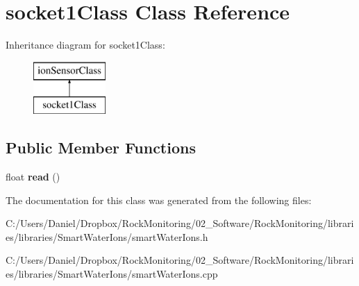 \hypertarget{classsocket1_class}{}\section{socket1\+Class Class Reference}
\label{classsocket1_class}
Inheritance diagram for socket1\+Class\+:\begin{figure}[H]
\begin{center}
\leavevmode
\includegraphics[height=2.000000cm]{classsocket1_class}
\end{center}
\end{figure}
\subsection*{Public Member Functions}
\begin{DoxyCompactItemize}
\item 
float {\bfseries read} ()\hypertarget{classsocket1_class_a0ad7dcd411aabee7afb280fa8b774f87}{}\label{classsocket1_class_a0ad7dcd411aabee7afb280fa8b774f87}

\end{DoxyCompactItemize}


The documentation for this class was generated from the following files\+:\begin{DoxyCompactItemize}
\item 
C\+:/\+Users/\+Daniel/\+Dropbox/\+Rock\+Monitoring/02\+\_\+\+Software/\+Rock\+Monitoring/libraries/libraries/\+Smart\+Water\+Ions/smart\+Water\+Ions.\+h\item 
C\+:/\+Users/\+Daniel/\+Dropbox/\+Rock\+Monitoring/02\+\_\+\+Software/\+Rock\+Monitoring/libraries/libraries/\+Smart\+Water\+Ions/smart\+Water\+Ions.\+cpp\end{DoxyCompactItemize}
